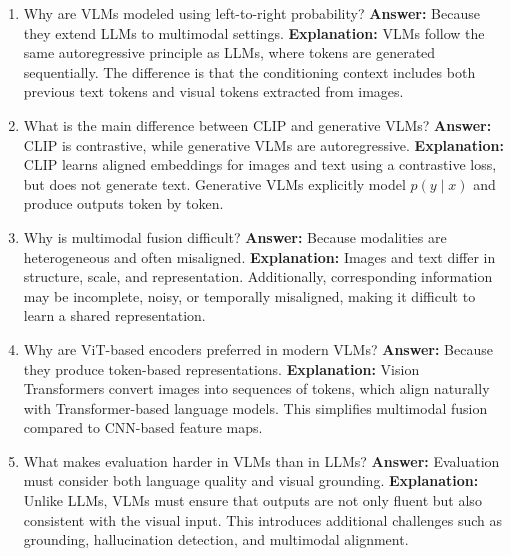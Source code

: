 \documentclass{article}
\begin{document}
\begin{enumerate}

\item Why are VLMs modeled using left-to-right probability?\newline
\textbf{Answer:} Because they extend LLMs to multimodal settings.\newline
\textbf{Explanation:} VLMs follow the same autoregressive principle as LLMs, where tokens are generated sequentially. The difference is that the conditioning context includes both previous text tokens and visual tokens extracted from images.

\item What is the main difference between CLIP and generative VLMs?\newline
\textbf{Answer:} CLIP is contrastive, while generative VLMs are autoregressive.\newline
\textbf{Explanation:} CLIP learns aligned embeddings for images and text using a contrastive loss, but does not generate text. Generative VLMs explicitly model $p(y \mid x)$ and produce outputs token by token.

\item Why is multimodal fusion difficult?\newline
\textbf{Answer:} Because modalities are heterogeneous and often misaligned.\newline
\textbf{Explanation:} Images and text differ in structure, scale, and representation. Additionally, corresponding information may be incomplete, noisy, or temporally misaligned, making it difficult to learn a shared representation.

\item Why are ViT-based encoders preferred in modern VLMs?\newline
\textbf{Answer:} Because they produce token-based representations.\newline
\textbf{Explanation:} Vision Transformers convert images into sequences of tokens, which align naturally with Transformer-based language models. This simplifies multimodal fusion compared to CNN-based feature maps.

\item What makes evaluation harder in VLMs than in LLMs?\newline
\textbf{Answer:} Evaluation must consider both language quality and visual grounding.\newline
\textbf{Explanation:} Unlike LLMs, VLMs must ensure that outputs are not only fluent but also consistent with the visual input. This introduces additional challenges such as grounding, hallucination detection, and multimodal alignment.


\end{enumerate}
\end{document}
